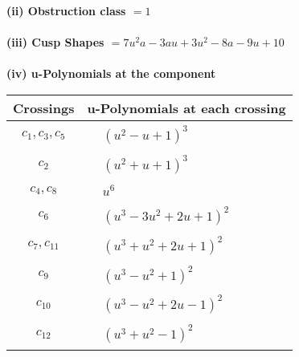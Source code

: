 \documentclass[1p]{elsarticle_modified}
\theoremstyle{definition}
\begin{document}
\flushleft \textbf{(ii) Obstruction class $= 1$}\\~\\
\flushleft \textbf{(iii) Cusp Shapes $= 7 u^2 a-3 a u+3 u^2-8 a-9 u+10$}\\~\\
\newpage\renewcommand{\arraystretch}{1}
\flushleft \textbf{(iv) u-Polynomials at the component}\newline \\
\begin{tabular}{m{50pt}|m{274pt}}
Crossings & \hspace{64pt}u-Polynomials at each crossing \\
\hline $$\begin{aligned}c_{1},c_{3},c_{5}\end{aligned}$$&$\begin{aligned}
&(u^2- u+1)^3
\end{aligned}$\\
\hline $$\begin{aligned}c_{2}\end{aligned}$$&$\begin{aligned}
&(u^2+u+1)^3
\end{aligned}$\\
\hline $$\begin{aligned}c_{4},c_{8}\end{aligned}$$&$\begin{aligned}
&u^6
\end{aligned}$\\
\hline $$\begin{aligned}c_{6}\end{aligned}$$&$\begin{aligned}
&(u^3-3 u^2+2 u+1)^2
\end{aligned}$\\
\hline $$\begin{aligned}c_{7},c_{11}\end{aligned}$$&$\begin{aligned}
&(u^3+u^2+2 u+1)^2
\end{aligned}$\\
\hline $$\begin{aligned}c_{9}\end{aligned}$$&$\begin{aligned}
&(u^3- u^2+1)^2
\end{aligned}$\\
\hline $$\begin{aligned}c_{10}\end{aligned}$$&$\begin{aligned}
&(u^3- u^2+2 u-1)^2
\end{aligned}$\\
\hline $$\begin{aligned}c_{12}\end{aligned}$$&$\begin{aligned}
&(u^3+u^2-1)^2
\end{aligned}$\\
\hline
\end{tabular}\\~\\
\end{document}
